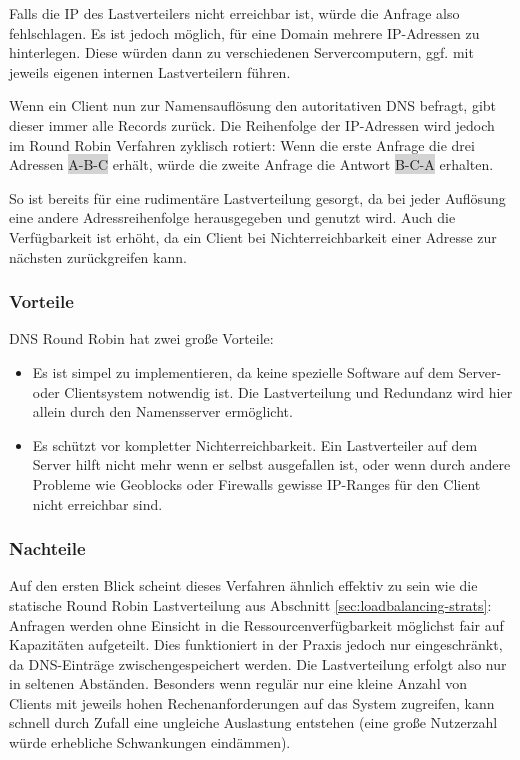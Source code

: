 Falls die IP des Lastverteilers nicht erreichbar ist, würde die Anfrage also fehlschlagen.
Es ist jedoch möglich, für eine Domain mehrere IP-Adressen zu hinterlegen.
Diese würden dann zu verschiedenen Servercomputern, ggf. mit jeweils eigenen internen Lastverteilern führen.

Wenn ein Client nun zur Namensauflösung den autoritativen DNS befragt, gibt dieser immer alle Records zurück.
Die Reihenfolge der IP-Adressen wird jedoch im Round Robin Verfahren zyklisch rotiert:
Wenn die erste Anfrage die drei Adressen \colorbox{lightgray}{A-B-C} erhält, würde die zweite Anfrage die Antwort \colorbox{lightgray}{B-C-A} erhalten.

So ist bereits für eine rudimentäre Lastverteilung gesorgt, da bei jeder Auflösung eine andere Adressreihenfolge herausgegeben und genutzt wird.
Auch die Verfügbarkeit ist erhöht, da ein Client bei Nichterreichbarkeit einer Adresse zur nächsten zurückgreifen kann.

\subsubsection{Vorteile}
DNS Round Robin hat zwei große Vorteile:
\begin{itemize}
	\item Es ist simpel zu implementieren, da keine spezielle Software auf dem Server- oder Clientsystem notwendig ist. Die Lastverteilung und Redundanz wird hier allein durch den Namensserver ermöglicht.
	\item Es schützt vor kompletter Nichterreichbarkeit. Ein Lastverteiler auf dem Server hilft nicht mehr wenn er selbst ausgefallen ist, oder wenn durch andere Probleme wie Geoblocks oder Firewalls gewisse IP-Ranges für den Client nicht erreichbar sind.
\end{itemize}

\subsubsection{Nachteile}
Auf den ersten Blick scheint dieses Verfahren ähnlich effektiv zu sein wie die statische Round Robin Lastverteilung aus Abschnitt \ref{sec:loadbalancing-strats}:
Anfragen werden ohne Einsicht in die Ressourcenverfügbarkeit möglichst fair auf Kapazitäten aufgeteilt.
Dies funktioniert in der Praxis jedoch nur eingeschränkt, da DNS-Einträge zwischengespeichert werden.
Die Lastverteilung erfolgt also nur in seltenen Abständen.
Besonders wenn regulär nur eine kleine Anzahl von Clients mit jeweils hohen Rechenanforderungen auf das System zugreifen,
kann schnell durch Zufall eine ungleiche Auslastung entstehen (eine große Nutzerzahl würde erhebliche Schwankungen eindämmen).

